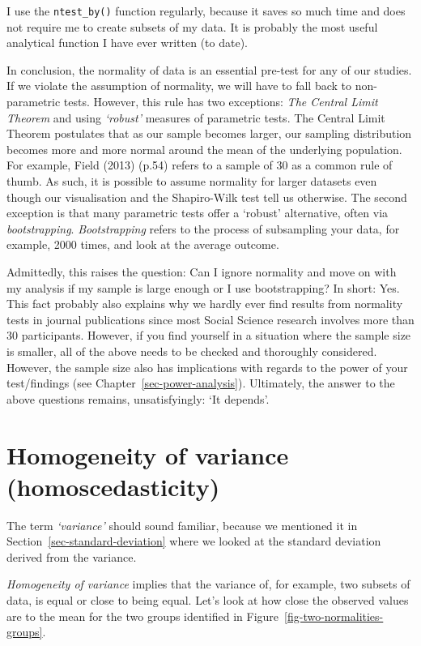 \documentclass[
  letterpaper,
]{krantz}
\begin{document}
I use the \texttt{ntest\_by()} function regularly, because it saves so
much time and does not require me to create subsets of my data. It is
probably the most useful analytical function I have ever written (to
date).

In conclusion, the normality of data is an essential pre-test for any of
our studies. If we violate the assumption of normality, we will have to
fall back to non-parametric tests. However, this rule has two
exceptions: \emph{The Central Limit Theorem} and using \emph{`robust'}
measures of parametric tests. The Central Limit Theorem postulates that
as our sample becomes larger, our sampling distribution becomes more and
more normal around the mean of the underlying population. For example,
Field (2013) (p.54) refers to a sample of 30 as a common rule of thumb.
As such, it is possible to assume normality for larger datasets even
though our visualisation and the Shapiro-Wilk test tell us otherwise.
The second exception is that many parametric tests offer a `robust'
alternative, often via \emph{bootstrapping}. \emph{Bootstrapping} refers
to the process of subsampling your data, for example, 2000 times, and
look at the average outcome.

Admittedly, this raises the question: Can I ignore normality and move on
with my analysis if my sample is large enough or I use bootstrapping? In
short: Yes. This fact probably also explains why we hardly ever find
results from normality tests in journal publications since most Social
Science research involves more than 30 participants. However, if you
find yourself in a situation where the sample size is smaller, all of
the above needs to be checked and thoroughly considered. However, the
sample size also has implications with regards to the power of your
test/findings (see Chapter~\ref{sec-power-analysis}). Ultimately, the
answer to the above questions remains, unsatisfyingly: `It depends'.

\section{Homogeneity of variance
(homoscedasticity)}\label{sec-homogeneity-of-variance}

The term \emph{`variance'} should sound familiar, because we mentioned
it in Section~\ref{sec-standard-deviation} where we looked at the
standard deviation derived from the variance.

\emph{Homogeneity of variance} implies that the variance of, for
example, two subsets of data, is equal or close to being equal. Let's
look at how close the observed values are to the mean for the two groups
identified in Figure~\ref{fig-two-normalities-groups}.
\end{document}
